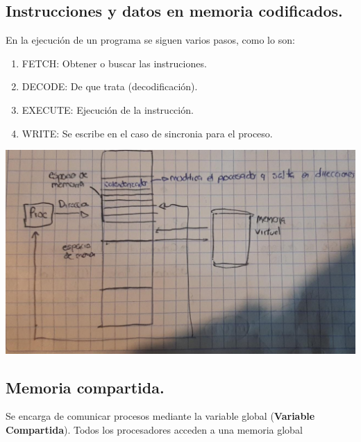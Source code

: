 \documentclass[12pt]{article}
\begin{document}
{\color{blue} \subsection*{\textbf{Instrucciones y datos en memoria codificados.}}}
En la ejecución de un programa se siguen varios pasos, como lo son:\\
\begin{enumerate}
    \item FETCH: Obtener o buscar las instruciones.
    \item DECODE: De que trata (decodificación).
    \item EXECUTE: Ejecución de la instrucción.
    \item WRITE: Se escribe en el caso de sincronia para el proceso.
\end{enumerate}

\includegraphics[scale = 0.30]{images/esquema2.jpeg} \\

{\color{blue} \subsection*{\textbf{Memoria compartida.}}}
Se encarga de comunicar procesos mediante la variable global (\textbf{Variable Compartida}).
Todos los procesadores acceden a una memoria global \\
\end{document}
